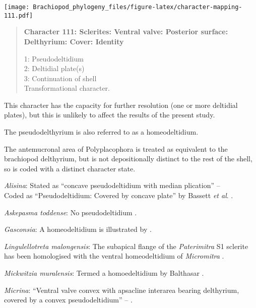 \documentclass[openany]{book}
\theoremstyle{definition}
\theoremstyle{definition}
\theoremstyle{definition}
\theoremstyle{remark}
\begin{document}
\texttt{[image: Brachiopod\_phylogeny\_files/figure-latex/character-mapping-111.pdf]}

\begin{quote}
\textbf{Character 111: Sclerites: Ventral valve: Posterior surface:
Delthyrium: Cover: Identity}

1: Pseudodeltidium\\
2: Deltidial plate(s)\\
3: Continuation of shell\\
Transformational character.
\end{quote}

This character has the capacity for further resolution (one or more
deltidial plates), but this is unlikely to affect the results of the
present study.

The pseudodelthyrium is also referred to as a homeodeltidium.

The antemucronal area of Polyplacophora is treated as equivalent to the
brachiopod delthyrium, but is not depositionally distinct to the rest of
the shell, so is coded with a distinct character state.

\hypertarget{Alisina-coding-111}{}
\emph{Alisina}: Stated as ``concave pseudodeltidium with median
plication'' -- \citet{Williams2000LinguliformeaCraniiformea}\\
Coded as ``Pseudodeltidium: Covered by concave plate'' by Bassett
\emph{et al}. \citeyearpar{Bassett2001Functionalmorphology}.

\hypertarget{Askepasma_toddense-coding-111}{}
\emph{Askepasma toddense}: No pseudodeltidium
\citep[p.~153]{Williams2000LinguliformeaCraniiformea}.

\hypertarget{Gasconsia-coding-111}{}
\emph{Gasconsia}: A homeodeltidium is illustrated by
\citet{Hanken1985Thetaxonomy}.

\hypertarget{Lingulellotreta_malongensis-coding-111}{}
\emph{Lingulellotreta malongensis}: The subapical flange of the
\emph{Paterimitra} S1 sclerite has been homologised with the ventral
homeodeltidium of \emph{Micromitra} \citep{Larsson2014iPaterimitra}.

\hypertarget{Mickwitzia_muralensis-coding-111}{}
\emph{Mickwitzia muralensis}: Termed a homoedeltidium by Balthasar
\citeyearpar{Balthasar2004Shellstructure}.

\hypertarget{Micrina-coding-111}{}
\emph{Micrina}: ``Ventral valve convex with apsacline interarea bearing
delthyrium, covered by a convex pseudodeltidium'' --
\citet{Holmer2008TheEarly}.
\end{document}

